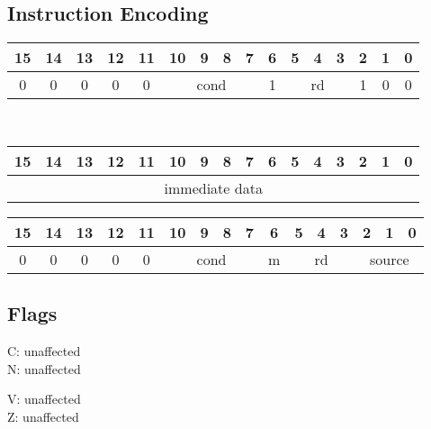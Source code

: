 \documentclass[11pt]{book}
\newcommand*{\encoding}[1]{\noindent
\begin{tabular}{|c|c|c|c|c|c|c|c|c|c|c|c|c|c|c|c|}
\multicolumn{1}{c}{15}&
\multicolumn{1}{c}{14}&
\multicolumn{1}{c}{13}&
\multicolumn{1}{c}{12}&
\multicolumn{1}{c}{11}&
\multicolumn{1}{c}{10}&
\multicolumn{1}{c}{9}&
\multicolumn{1}{c}{8}&
\multicolumn{1}{c}{7}&
\multicolumn{1}{c}{6}&
\multicolumn{1}{c}{5}&
\multicolumn{1}{c}{4}&
\multicolumn{1}{c}{3}&
\multicolumn{1}{c}{2}&
\multicolumn{1}{c}{1}&
\multicolumn{1}{c}{0}\\\hline
#1\\\hline
\end{tabular}}
\begin{document}
\subsection*{Instruction Encoding}
\encoding{0&0&0&0&0%
&\multicolumn{4}{|c|}{cond}%
&1&\multicolumn{3}{|c|}{rd}&1&0&0}\\\null\qquad
\encoding{\multicolumn{16}{|c|}{immediate data}}

\vspace{2\baselineskip}
\encoding{0&0&0&0&0%
&\multicolumn{4}{|c|}{cond}%
&m&\multicolumn{3}{|c|}{rd}&\multicolumn{3}{|c|}{source}}

\subsection*{Flags}
\begin{multicols}{2}\noindent
  C: unaffected\\
  N: unaffected

  \columnbreak\noindent
  V: unaffected\\
  Z: unaffected
\end{multicols}
\end{document}
